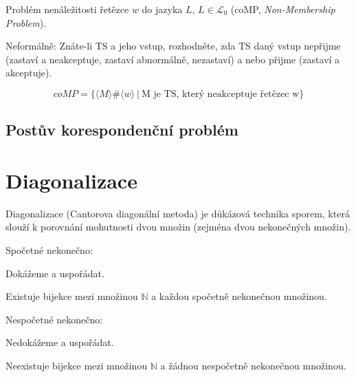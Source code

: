 \begin{compactitem}
    \item Problém nenáležitosti řetězce $w$ do jazyka $L$, $L \in \mathcal{L}_0$ (coMP, \textit{Non-Membership Problem}).

    \item Neformálně: Znáte-li TS a jeho vstup, rozhodněte, zda TS daný vstup nepřijme (zastaví a neakceptuje, zastaví abnormálně, nezastaví) a nebo přijme (zastaví a akceptuje).

    \item {}
\end{compactitem}

$$ coMP = \{ \langle M \rangle \# \langle w \rangle ~|~ \text{M je TS, který neakceptuje řetězec w} \} $$

\subsection*{Postův korespondenční problém}



\section{Diagonalizace}

\begin{compactitem}
    \item Diagonalizace (Cantorova diagonální metoda) je důkázová technika sporem, která slouží k porovnání mohutnosti dvou množin (zejména dvou nekonečných množin).

    \item Spočetné nekonečno: \begin{compactitem}
        \item Dokážeme  a uspořádat.
        \item Existuje bijekce mezi množinou $\mathbb{N}$ a každou spočetně nekonečnou množinou.
    \end{compactitem}

    \item Nespočetné nekonečno: \begin{compactitem}
        \item Nedokážeme  a uspořádat.
        \item Neexistuje bijekce mezi množinou $\mathbb{N}$ a žádnou nespočetně nekonečnou množinou.
    \end{compactitem}
\end{compactitem}

